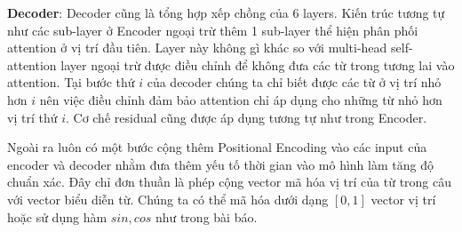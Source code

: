 \textbf{Decoder}: Decoder cũng là tổng hợp xếp chồng của 6 layers. Kiến trúc tương tự như các sub-layer ở Encoder ngoại trừ thêm 1 sub-layer thể hiện phân phối attention ở vị trí đầu tiên. Layer này không gì khác so với multi-head self-attention layer ngoại trừ được điều chỉnh để không đưa các từ trong tương lai vào attention. Tại bước thứ $i$ của decoder chúng ta chỉ biết được các từ ở vị trí nhỏ hơn $i$ nên việc điều chỉnh đảm bảo attention chỉ áp dụng cho những từ nhỏ hơn vị trí thứ $i$. Cơ chế residual cũng được áp dụng tương tự như trong Encoder.

Ngoài ra luôn có một bước cộng thêm Positional Encoding vào các input của encoder và decoder nhằm đưa thêm yếu tố thời gian vào mô hình làm tăng độ chuẩn xác. Đây chỉ đơn thuần là phép cộng vector mã hóa vị trí của từ trong câu với vector biểu diễn từ. Chúng ta có thể mã hóa dưới dạng $[0, 1]$ vector vị trí hoặc sử dụng hàm $sin,cos$ như trong bài báo.

